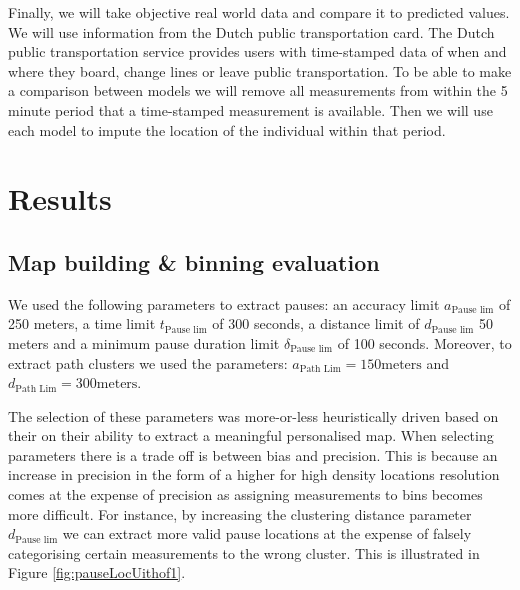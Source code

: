 \documentclass[man]{apa6}
\theoremstyle{definition}
\theoremstyle{definition}
\theoremstyle{definition}
\theoremstyle{remark}
\begin{document}
Finally, we will take objective real world data and compare it to
predicted values. We will use information from the Dutch public
transportation card. The Dutch public transportation service provides
users with time-stamped data of when and where they board, change lines
or leave public transportation. To be able to make a comparison between
models we will remove all measurements from within the 5 minute period
that a time-stamped measurement is available. Then we will use each
model to impute the location of the individual within that period.

\section{Results}\label{results}

\subsection{Map building \& binning
evaluation}\label{map-building-binning-evaluation-1}

We used the following parameters to extract pauses: an accuracy limit
\(a_{\text{Pause lim}}\) of 250 meters, a time limit
\(t_{\text{Pause lim}}\) of 300 seconds, a distance limit of
\(d_{\text{Pause lim}}\) 50 meters and a minimum pause duration limit
\(\delta_{\text{Pause lim}}\) of 100 seconds. Moreover, to extract path
clusters we used the parameters:
\(a_{\text{Path Lim}} = 150 \text{meters}\) and
\(d_{\text{Path Lim}} =300 \text{meters}\).

The selection of these parameters was more-or-less heuristically driven
based on their on their ability to extract a meaningful personalised
map. When selecting parameters there is a trade off is between bias and
precision. This is because an increase in precision in the form of a
higher for high density locations resolution comes at the expense of
precision as assigning measurements to bins becomes more difficult. For
instance, by increasing the clustering distance parameter
\(d_{\text{Pause lim}}\) we can extract more valid pause locations at
the expense of falsely categorising certain measurements to the wrong
cluster. This is illustrated in Figure \ref{fig:pauseLocUithof1}.
\end{document}
